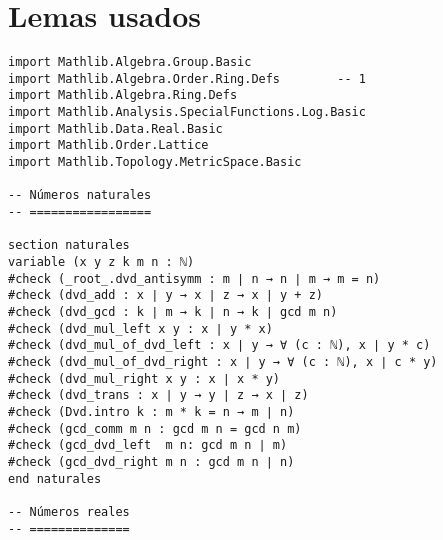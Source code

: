 \chapter*{Lemas usados}
\begin{verbatim}
import Mathlib.Algebra.Group.Basic
import Mathlib.Algebra.Order.Ring.Defs        -- 1
import Mathlib.Algebra.Ring.Defs
import Mathlib.Analysis.SpecialFunctions.Log.Basic
import Mathlib.Data.Real.Basic
import Mathlib.Order.Lattice
import Mathlib.Topology.MetricSpace.Basic

-- Números naturales
-- =================

section naturales
variable (x y z k m n : ℕ)
#check (_root_.dvd_antisymm : m ∣ n → n ∣ m → m = n)
#check (dvd_add : x ∣ y → x ∣ z → x ∣ y + z)
#check (dvd_gcd : k ∣ m → k ∣ n → k ∣ gcd m n)
#check (dvd_mul_left x y : x ∣ y * x)
#check (dvd_mul_of_dvd_left : x ∣ y → ∀ (c : ℕ), x ∣ y * c)
#check (dvd_mul_of_dvd_right : x ∣ y → ∀ (c : ℕ), x ∣ c * y)
#check (dvd_mul_right x y : x ∣ x * y)
#check (dvd_trans : x ∣ y → y ∣ z → x ∣ z)
#check (Dvd.intro k : m * k = n → m ∣ n)
#check (gcd_comm m n : gcd m n = gcd n m)
#check (gcd_dvd_left  m n: gcd m n ∣ m)
#check (gcd_dvd_right m n : gcd m n ∣ n)
end naturales

-- Números reales
-- ==============


\end{verbatim}
